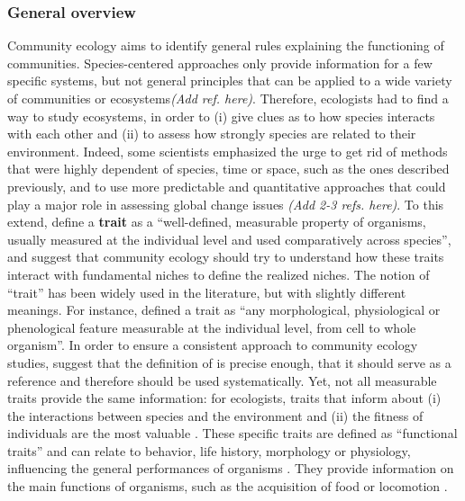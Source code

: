 \subsubsection{General overview}
Community ecology aims to identify general rules explaining the functioning of communities. Species-centered approaches only provide information for a few specific systems, but not general principles that can be applied to a wide variety of communities or ecosystems\emph{(Add ref. here)}. Therefore, ecologists had to find a way to study ecosystems, in order to (i) give clues as to how species interacts with each other and (ii) to assess how strongly species are related to their environment. Indeed, some scientists emphasized the urge to get rid of methods that were highly dependent of species, time or space, such as the ones described previously, and to use more predictable and quantitative approaches that could play a major role in assessing global change issues \emph{(Add 2-3 refs. here)}. To this extend, \citet{mcgill2006} define a \textbf{trait} as a ``well-defined, measurable property of organisms, usually measured at the individual level and used comparatively across species'', and suggest that community ecology should try to understand how these traits interact with fundamental niches to define the realized niches. The notion of ``trait'' has been widely used in the literature, but with slightly different meanings. For instance, \citet{violle2007} defined a trait as ``any morphological, physiological or phenological feature measurable at the individual level, from cell to whole organism''. In order to ensure a consistent approach to community ecology studies, \citet{martini2020} suggest that the definition of \citeauthor{violle2007} is precise enough, that it should serve as a reference and therefore should be used systematically. Yet, not all measurable traits provide the same information: for ecologists, traits that inform about (i) the interactions between species and the environment and (ii) the fitness of individuals are the most valuable \citep{kremer2017}. These specific traits are defined as ``functional traits'' and can relate to behavior, life history, morphology or physiology, influencing the general performances of organisms \citep{martini2020, mcgill2006}. They provide information on the main functions of organisms, such as the acquisition of food or locomotion \citep{mejri2009}.

